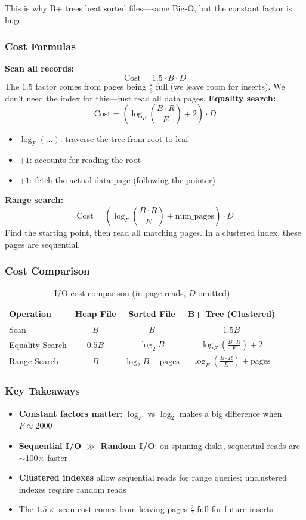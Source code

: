 This is why B+ trees beat sorted files---same Big-O, but the constant factor is huge.
\subsubsection*{Cost Formulas}
\textbf{Scan all records:}
\[
\text{Cost} = 1.5 \cdot B \cdot D
\]
The $1.5$ factor comes from pages being $\frac{2}{3}$ full (we leave room for inserts). We don't need the index for this---just read all data pages.
\textbf{Equality search:}
\[
\text{Cost} = \left( \log_F \left( \frac{B \cdot R}{E} \right) + 2 \right) \cdot D
\]
\begin{itemize}
    \item $\log_F(\ldots)$: traverse the tree from root to leaf
    \item $+1$: accounts for reading the root
    \item $+1$: fetch the actual data page (following the pointer)
\end{itemize}
\textbf{Range search:}
\[
\text{Cost} = \left( \log_F \left( \frac{B \cdot R}{E} \right) + \text{num\_pages} \right) \cdot D
\]
Find the starting point, then read all matching pages. In a clustered index, these pages are sequential.
\subsubsection*{Cost Comparison}
\begin{table}[H]
    \centering
    \begin{tabular}{lccc}
        \toprule
        \textbf{Operation} & \textbf{Heap File} & \textbf{Sorted File} & \textbf{B+ Tree (Clustered)} \\
        \midrule
        Scan & $B$ & $B$ & $1.5B$ \\
        Equality Search & $0.5B$ & $\log_2 B$ & $\log_F \left( \frac{B \cdot R}{E} \right) + 2$ \\
        Range Search & $B$ & $\log_2 B + \text{pages}$ & $\log_F \left( \frac{B \cdot R}{E} \right) + \text{pages}$ \\
        \bottomrule
    \end{tabular}
    \caption{I/O cost comparison (in page reads, $D$ omitted)}
\end{table}
\subsubsection*{Key Takeaways}
\begin{itemize}
    \item \textbf{Constant factors matter}: $\log_F$ vs $\log_2$ makes a big difference when $F \approx 2000$
    \item \textbf{Sequential I/O $\gg$ Random I/O}: on spinning disks, sequential reads are $\sim$100$\times$ faster
    \item \textbf{Clustered indexes} allow sequential reads for range queries; unclustered indexes require random reads
    \item The $1.5\times$ scan cost comes from leaving pages $\frac{2}{3}$ full for future inserts
\end{itemize}
